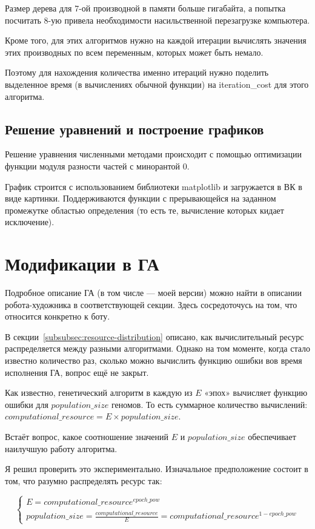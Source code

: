 \documentclass[11pt]{article}
\begin{document}
    Размер дерева для 7-ой производной в памяти больше гигабайта, а попытка посчитать 8-ую привела необходимости насильственной перезагрузке компьютера.

    Кроме того, для этих алгоритмов нужно на каждой итерации вычислять значения этих производных по всем переменным, которых может быть немало.

    Поэтому для нахождения количества именно итераций нужно поделить выделенное время (в вычислениях обычной функции) на
    iteration\_cost для этого алгоритма.

    \subsection{Решение уравнений и построение графиков}
    Решение уравнения численными методами происходит с помощью оптимизации функции модуля разности частей с минорантой 0.

    График строится с использованием библиотеки matplotlib и загружается в ВК в виде картинки.
    Поддерживаются функции с прерывающейся на заданном промежутке областью определения (то есть те, вычисление которых кидает исключение).

    \section{Модификации в ГА}\label{sec:ga-modifications}
    Подробное описание ГА (в том числе — моей версии) можно найти в описании робота-художника в соответствующей секции.
    Здесь сосредоточусь на том, что относится конкретно к боту.

    В секции~\ref{subsubsec:resource-distribution} описано, как вычислительный ресурс распределяется между разными алгоритмами.
    Однако на том моменте, когда стало известно количество раз, сколько можно вычислить функцию ошибки вов время исполнения ГА,
    вопрос ещё не закрыт.

    Как известно, генетический алгоритм в каждую из $E$ «эпох» вычисляет функцию ошибки для $population\_size$ геномов.
    То есть суммарное количество вычислений: $computational\_resource = E \times population\_size$.

    Встаёт вопрос, какое соотношение значений $E$ и $population\_size$ обеспечивает наилучшую работу алгоритма.

    Я решил проверить это экспериментально.
    Изначальное предположение состоит в том, что разумно распределять ресурс так:

    \begin{equation}
        \begin{cases}
            E = computational\_resource^{epoch\_pow} \\
            population\_size = \frac{computational\_resource}{E} = computational\_resource^{1 - epoch\_pow}
        \end{cases}
    \end{equation}
\end{document}
